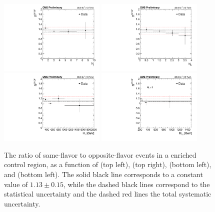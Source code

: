\begin{figure}
	\centering
	\includegraphics[width=0.45\textwidth]{backgrounds/figs/RSFOF_nj}
	\includegraphics[width=0.45\textwidth]{backgrounds/figs/RSFOF_nb}
	\includegraphics[width=0.45\textwidth]{backgrounds/figs/RSFOF_ht}
	\includegraphics[width=0.45\textwidth]{backgrounds/figs/RSFOF_mt2}
	\caption{The ratio of same-flavor to opposite-flavor events in a \ttbar enriched control region, as a function of \nj (top left), \nb (top right), \HT (bottom left), and \mttwo (bottom left). The solid black line corresponds to a constant value of $1.13 \pm 0.15$, while the dashed black lines correspond to the statistical uncertainty and the dashed red lines the total systematic uncertainty.}
	\label{fig:rsfof}
\end{figure}

